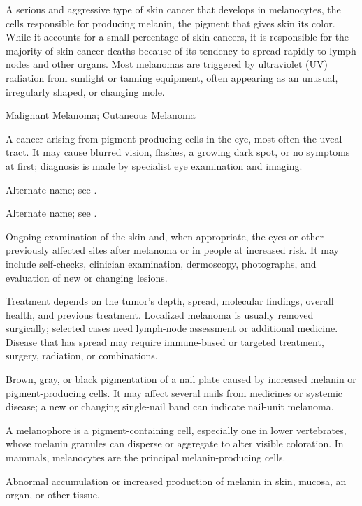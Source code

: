  A serious and aggressive type of skin cancer that develops in melanocytes, the cells responsible for producing melanin, the pigment that gives skin its color. While it accounts for a small percentage of skin cancers, it is responsible for the majority of skin cancer deaths because of its tendency to spread rapidly to lymph nodes and other organs. Most melanomas are triggered by ultraviolet (UV) radiation from sunlight or tanning equipment, often appearing as an unusual, irregularly shaped, or changing mole.

\synonyms
Malignant Melanoma; Cutaneous Melanoma

 A cancer arising from pigment-producing cells in the eye, most often the uveal tract. It may cause blurred vision, flashes, a growing dark spot, or no symptoms at first; diagnosis is made by specialist eye examination and imaging.

 Alternate name; see .

 Alternate name; see .

 Ongoing examination of the skin and, when appropriate, the eyes or other previously affected sites after melanoma or in people at increased risk. It may include self-checks, clinician examination, dermoscopy, photographs, and evaluation of new or changing lesions.

 Treatment depends on the tumor’s depth, spread, molecular findings, overall health, and previous treatment. Localized melanoma is usually removed surgically; selected cases need lymph-node assessment or additional medicine. Disease that has spread may require immune-based or targeted treatment, surgery, radiation, or combinations.

 Brown, gray, or black pigmentation of a nail plate caused by increased melanin or pigment-producing cells. It may affect several nails from medicines or systemic disease; a new or changing single-nail band can indicate nail-unit melanoma.

 A melanophore is a pigment-containing cell, especially one in lower vertebrates, whose melanin granules can disperse or aggregate to alter visible coloration. In mammals, melanocytes are the principal melanin-producing cells.

 Abnormal accumulation or increased production of melanin in skin, mucosa, an organ, or other tissue.

